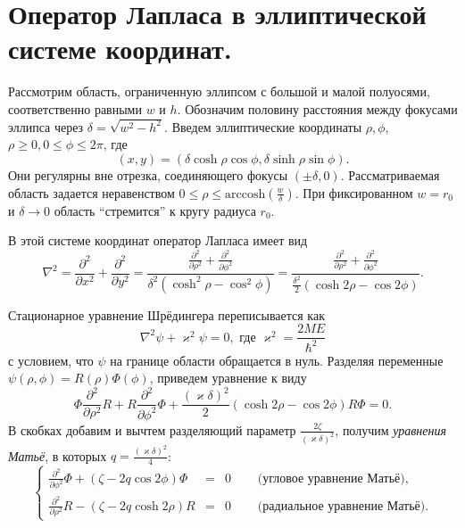 \section{Оператор Лапласа в эллиптической системе координат.}\label{sec:ch1/sec3}

Рассмотрим область, ограниченную эллипсом с большой и малой полуосями, соответственно равными $w$ и $h$.
Обозначим половину расстояния между фокусами эллипса через  $\delta = \sqrt{w^2 - h^2}$.
Введем эллиптические координаты $\rho, \phi$, $\rho\ge 0, 0\le\phi \le 2\pi$, где 
$$(x, y) = (\delta\cosh{\rho}\cos{\phi}, \delta\sinh{\rho}\sin{\phi}). $$
Они регулярны вне отрезка, соединяющего фокусы $(\pm\delta,0)$.
 Рассматриваемая область задается неравенством $0 \leq \rho \leq \text{arccosh} (\frac{w}{\delta})$. 
При фиксированном $w=r_0$ и  $\delta\to 0$
область ``стремится'' к кругу радиуса $r_0$.
 
 В этой системе координат оператор Лапласа имеет вид
$$\nabla^2 = \frac{\partial^2}{\partial x^2} + \frac{\partial^2}{\partial y^2} = \frac{\frac{\partial^2}{\partial \rho^2} + \frac{\partial^2}{\partial \phi^2}}{\delta^2(\cosh^2{\rho} - \cos^2{\phi})} = 
\frac{\frac{\partial^2}{\partial \rho^2} + \frac{\partial^2}{\partial \phi^2}}{\frac{\delta^2}{2}(\cosh{2\rho} - \cos{2\phi})}.$$

 
Стационарное уравнение Шрёдингера 
переписывается как
$$ \nabla^2 \psi +\varkappa^2\psi =  0, \text{  где  }\varkappa^2 =\frac{2ME}{\hbar^2}$$
с условием, что $\psi$ на границе области обращается в нуль.
Разделяя переменные $\psi(\rho,\phi) = R(\rho)\Phi(\phi)$, приведем уравнение к виду
$$\Phi\frac{\partial^2}{\partial \rho^2}R + R\frac{\partial^2}{\partial \phi^2}\Phi + \frac{(\varkappa \delta)^2}{2}(\cosh{2\rho} - \cos{2\phi})R\Phi = 0. $$
В скобках добавим и вычтем разделяющий параметр $\frac{2\zeta}{(\varkappa \delta)^2}$, получим \textit{уравнения Матьё}, в которых $q=\frac{(\varkappa \delta)^2}{4}$:
\begin{equation}
\left\{
\begin{array}{rcll}

			\frac{\partial^2}{\partial \phi^2}\Phi + (\zeta - 2q\cos{2\phi})\Phi &= &0 \quad 	 &\textit{   (угловое уравнение Матьё)}, \\
		\frac{\partial^2}{\partial \rho^2}R - (\zeta - 2q\cosh{2\rho})R &=& 0 	\quad	& \textit{   (радиальное уравнение Матьё)}.  
\end{array}
\right.
\label{eq:mathieusystem}
\end{equation}


